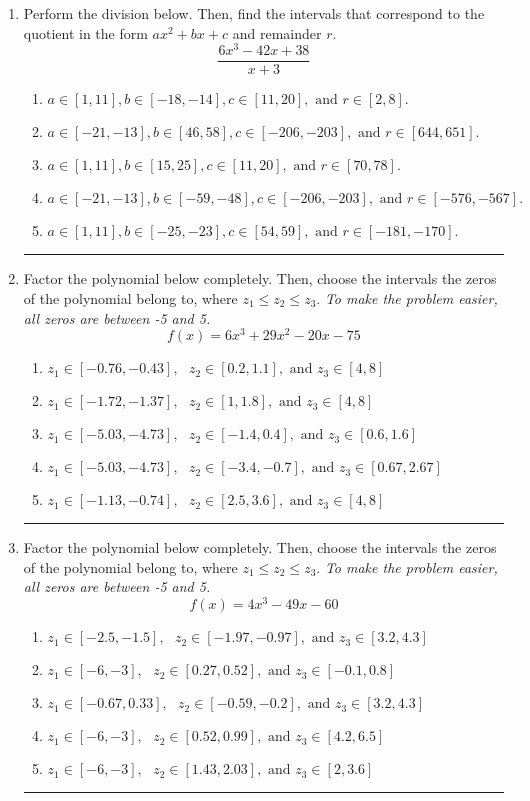 \documentclass[14pt]{extbook}
\newcommand{\litem}[1]{\item#1\hspace*{-1cm}\rule{\textwidth}{0.4pt}}
\begin{document}
\begin{enumerate}
{\begin{enumerate}[label=\Alph*.]
\end{enumerate} }
\litem{
Perform the division below. Then, find the intervals that correspond to the quotient in the form $ax^2+bx+c$ and remainder $r$.\[ \frac{6x^{3} -42 x + 38}{x + 3} \]\begin{enumerate}[label=\Alph*.]
\item \( a \in [1, 11], b \in [-18, -14], c \in [11, 20], \text{ and } r \in [2, 8]. \)
\item \( a \in [-21, -13], b \in [46, 58], c \in [-206, -203], \text{ and } r \in [644, 651]. \)
\item \( a \in [1, 11], b \in [15, 25], c \in [11, 20], \text{ and } r \in [70, 78]. \)
\item \( a \in [-21, -13], b \in [-59, -48], c \in [-206, -203], \text{ and } r \in [-576, -567]. \)
\item \( a \in [1, 11], b \in [-25, -23], c \in [54, 59], \text{ and } r \in [-181, -170]. \)

\end{enumerate} }
\litem{
Factor the polynomial below completely. Then, choose the intervals the zeros of the polynomial belong to, where $z_1 \leq z_2 \leq z_3$. \textit{To make the problem easier, all zeros are between -5 and 5.}\[ f(x) = 6x^{3} +29 x^{2} -20 x -75 \]\begin{enumerate}[label=\Alph*.]
\item \( z_1 \in [-0.76, -0.43], \text{   }  z_2 \in [0.2, 1.1], \text{   and   } z_3 \in [4, 8] \)
\item \( z_1 \in [-1.72, -1.37], \text{   }  z_2 \in [1, 1.8], \text{   and   } z_3 \in [4, 8] \)
\item \( z_1 \in [-5.03, -4.73], \text{   }  z_2 \in [-1.4, 0.4], \text{   and   } z_3 \in [0.6, 1.6] \)
\item \( z_1 \in [-5.03, -4.73], \text{   }  z_2 \in [-3.4, -0.7], \text{   and   } z_3 \in [0.67, 2.67] \)
\item \( z_1 \in [-1.13, -0.74], \text{   }  z_2 \in [2.5, 3.6], \text{   and   } z_3 \in [4, 8] \)

\end{enumerate} }
\litem{
Factor the polynomial below completely. Then, choose the intervals the zeros of the polynomial belong to, where $z_1 \leq z_2 \leq z_3$. \textit{To make the problem easier, all zeros are between -5 and 5.}\[ f(x) = 4x^{3} -49 x -60 \]\begin{enumerate}[label=\Alph*.]
\item \( z_1 \in [-2.5, -1.5], \text{   }  z_2 \in [-1.97, -0.97], \text{   and   } z_3 \in [3.2, 4.3] \)
\item \( z_1 \in [-6, -3], \text{   }  z_2 \in [0.27, 0.52], \text{   and   } z_3 \in [-0.1, 0.8] \)
\item \( z_1 \in [-0.67, 0.33], \text{   }  z_2 \in [-0.59, -0.2], \text{   and   } z_3 \in [3.2, 4.3] \)
\item \( z_1 \in [-6, -3], \text{   }  z_2 \in [0.52, 0.99], \text{   and   } z_3 \in [4.2, 6.5] \)
\item \( z_1 \in [-6, -3], \text{   }  z_2 \in [1.43, 2.03], \text{   and   } z_3 \in [2, 3.6] \)


\end{enumerate}}
\end{enumerate}
\end{document}
